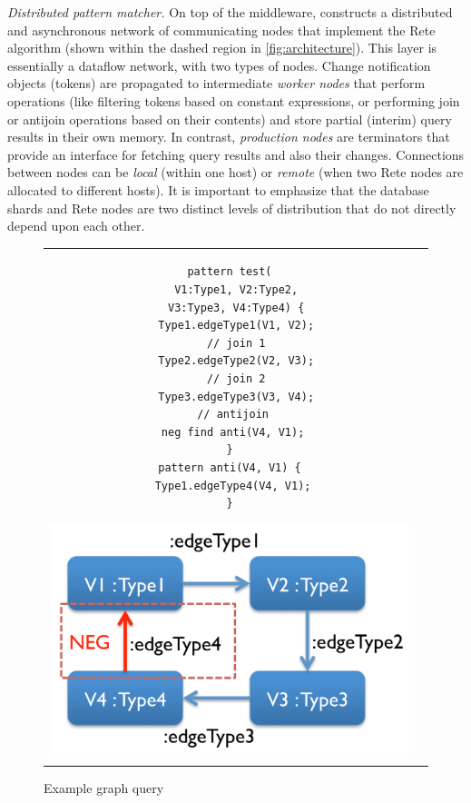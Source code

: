 \emph{Distributed pattern matcher.}\label{distributed_pattern_matcher}
On top of the middleware, \incqueryD{} constructs a distributed and asynchronous network of communicating nodes that implement the Rete~\cite{Forgy} algorithm (shown within the dashed region in \autoref{fig:architecture}). This layer is essentially a dataflow network, with two types of nodes. Change notification objects (tokens) are propagated to intermediate \emph{worker nodes} that perform operations (like filtering tokens based on constant expressions, or performing join or antijoin operations based on their contents) and
store partial (interim) query results in their own memory. In contrast, \emph{production nodes} are terminators that provide an interface for fetching query results and also their changes. Connections between nodes can be \emph{local} (within one host) or \emph{remote} (when two Rete nodes are allocated to different hosts). It is important to emphasize that the database shards and Rete nodes are two distinct levels of distribution that do not directly depend upon each other.

\begin{figure}[!h]
\begin{center}
\begin{tabular}{cc}
\begin{minipage}{0.35\columnwidth}
\begin{lstlisting}
pattern test(
  V1:Type1, V2:Type2,
  V3:Type3, V4:Type4) {
  Type1.edgeType1(V1, V2);
  // join 1
  Type2.edgeType2(V2, V3);
  // join 2
  Type3.edgeType3(V3, V4);
  // antijoin 
  neg find anti(V4, V1); 
}
pattern anti(V4, V1) {
 Type1.edgeType4(V4, V1);
}
\end{lstlisting}
\end{minipage}
\hspace{0.5cm}
\begin{minipage}{0.45\columnwidth}
  \includegraphics[width=\textwidth]{figures/patterndef}
\end{minipage}
\end{tabular}
\end{center}
\caption{Example graph query}
\label{fig:patterndef}
\end{figure}

